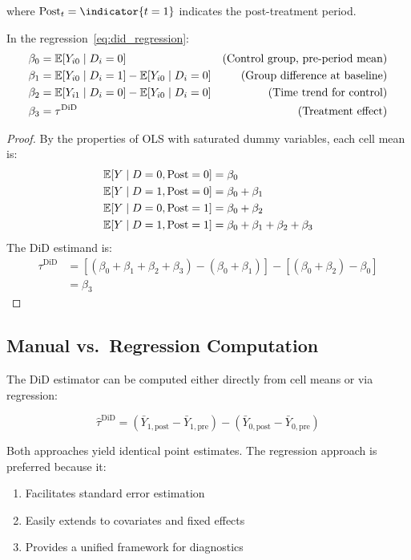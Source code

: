 where $\text{Post}_t = \indicator{t = 1}$ indicates the post-treatment period.

\begin{theorem}
\label{thm:did_coefficients}
In the regression~\eqref{eq:did_regression}:
\begin{align}
\beta_0 &= \mathbb{E}[Y_{i0} \mid D_i = 0] & \text{(Control group, pre-period mean)} \\
\beta_1 &= \mathbb{E}[Y_{i0} \mid D_i = 1] - \mathbb{E}[Y_{i0} \mid D_i = 0] & \text{(Group difference at baseline)} \\
\beta_2 &= \mathbb{E}[Y_{i1} \mid D_i = 0] - \mathbb{E}[Y_{i0} \mid D_i = 0] & \text{(Time trend for control)} \\
\beta_3 &= \tau^{\text{DiD}} & \text{(Treatment effect)}
\end{align}
\end{theorem}

\begin{proof}
By the properties of OLS with saturated dummy variables, each cell mean is:
\begin{align*}
\mathbb{E}[Y \mid D=0, \text{Post}=0] &= \beta_0 \\
\mathbb{E}[Y \mid D=1, \text{Post}=0] &= \beta_0 + \beta_1 \\
\mathbb{E}[Y \mid D=0, \text{Post}=1] &= \beta_0 + \beta_2 \\
\mathbb{E}[Y \mid D=1, \text{Post}=1] &= \beta_0 + \beta_1 + \beta_2 + \beta_3
\end{align*}
The DiD estimand is:
\begin{align*}
\tau^{\text{DiD}} &= [(\beta_0 + \beta_1 + \beta_2 + \beta_3) - (\beta_0 + \beta_1)] - [(\beta_0 + \beta_2) - \beta_0] \\
&= \beta_3
\end{align*}
\end{proof}

\subsection{Manual vs.\ Regression Computation}

The DiD estimator can be computed either directly from cell means or via regression:

\begin{equation}
\hat{\tau}^{\text{DiD}} = (\bar{Y}_{1,\text{post}} - \bar{Y}_{1,\text{pre}}) - (\bar{Y}_{0,\text{post}} - \bar{Y}_{0,\text{pre}})
\label{eq:did_manual}
\end{equation}

Both approaches yield identical point estimates. The regression approach is preferred because it:
\begin{enumerate}
    \item Facilitates standard error estimation
    \item Easily extends to covariates and fixed effects
    \item Provides a unified framework for diagnostics
\end{enumerate}

